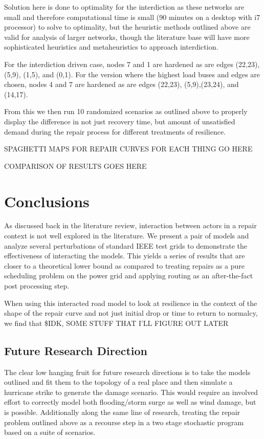 \documentclass{article}
\begin{document}
	Solution here is done to optimality for the interdiction as these networks are small and therefore computational time is small (90 minutes on a desktop with i7 processor) to solve to optimality, but the heuristic methods outlined above are valid for analysis of larger networks, though the literature base will have more sophisticated heuristics and metaheuristics to approach interdiction.
	
	For the interdiction driven case, nodes 7 and 1 are hardened as are edges (22,23), (5,9), (1,5), and (0,1). For the version where the highest load buses and edges are chosen, nodes 4 and 7 are hardened as are edges (22,23), (5,9),(23,24), and (14,17).
	
	From this we then run 10 randomized scenarios as outlined above to properly display the difference in not just recovery time, but amount of unsatisfied demand during the repair process for different treatments of resilience.
	
	SPAGHETTI MAPS FOR REPAIR CURVES FOR EACH THING GO HERE
	
	COMPARISON OF RESULTS GOES HERE
	\section{Conclusions}
	
	As discussed back in the literature review, interaction between actors in a repair context is not well explored in the literature. We present a pair of models and analyze several perturbations of standard IEEE test grids to demonstrate the effectiveness of interacting the models. This yields a series of results that are closer to a theoretical lower bound as compared to treating repairs as a pure scheduling problem on the power grid and applying routing as an after-the-fact post processing step.
	
	When using this interacted road model to look at resilience in the context of the shape of the repair curve and not just initial drop or time to return to normalcy, we find that \$IDK, SOME STUFF THAT I'LL FIGURE OUT LATER
	
	
	\subsection{Future Research Direction}
	The clear low hanging fruit for future research directions is to take the models outlined and fit them to the topology of a real place and then simulate a hurricane strike to generate the damage scenario. This would require an involved effort to correctly model both flooding/storm surge as well as wind damage, but is possible. Additionally along the same line of research, treating the repair problem outlined above as a recourse step in a two stage stochastic program based on a suite of scenarios.
	
\end{document}
